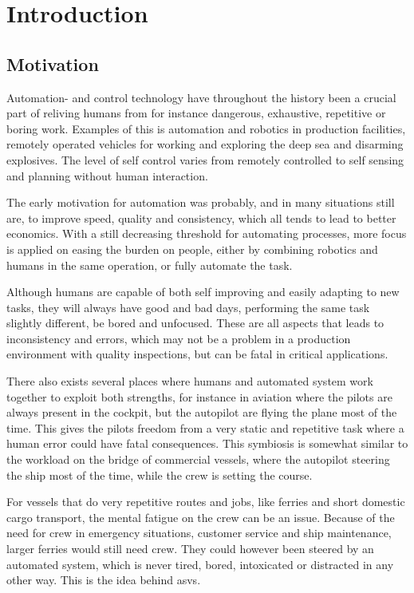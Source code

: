 
\chapter{Introduction} %
\section{Motivation}
Automation- and control technology have throughout the history been a crucial part of reliving humans from for instance dangerous, exhaustive, repetitive or boring work. Examples of this is automation and robotics in production facilities, remotely operated vehicles for working and exploring the deep sea and disarming explosives. The level of self control varies from remotely controlled to self sensing and planning without human interaction.

The early motivation for automation was probably, and in many situations still are, to improve speed, quality and consistency, which all tends to lead to better economics. With a still decreasing threshold for automating processes, more focus is applied on easing the burden on people, either by combining robotics and humans in the same operation, or fully automate the task.

Although humans are capable of both self improving and easily adapting to new tasks, they  will always have good and bad days, performing the same task slightly different, be bored and unfocused. These are all aspects that leads to inconsistency and errors, which may not be a problem in a production environment with quality inspections, but can be fatal in critical applications. 

There also exists several places where humans and automated system work together to exploit both strengths, for instance in aviation where the pilots are always present in the cockpit, but the autopilot are flying the plane most of the time. This gives the pilots freedom from a very static and repetitive task where a human error could have fatal consequences. This symbiosis is somewhat similar to the workload on the bridge of commercial vessels, where the autopilot steering the ship most of the time, while the crew is setting the course. 

For vessels that do very repetitive routes and jobs, like ferries and short domestic cargo transport, the mental fatigue on the crew can be an issue. Because of the need for crew in emergency situations, customer service and ship maintenance, larger ferries would still need crew. They could however been steered by an automated system, which is never tired, bored, intoxicated or distracted in any other way. This is the idea behind \glspl{asv}.

